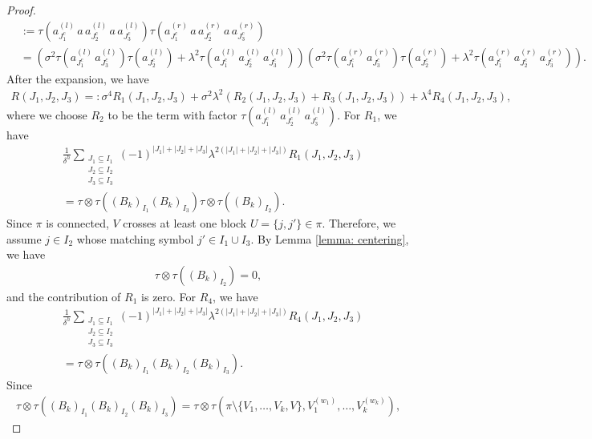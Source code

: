 \documentclass[10pt,a4paper]{amsart}
\begin{document}
\begin{proof}
\begin{align*}
        &:=\tau\left(a_{J_1^c}^{(l)}\, a \, a_{J_2^c}^{(l)}\, a \, a_{J_3^c}^{(l)}\right)\tau\left(a_{J_1^c}^{(r)}\, a \, a_{J_2^c}^{(r)}\, a\, a_{J_3^c}^{(r)}\right)\\
        &=\left(\sigma^2\tau(a_{J_1^c}^{(l)}\, a_{J_3^c}^{(l)})\tau(a_{J_2^c}^{(l)})+\lambda^2\tau(a_{J_1^c}^{(l)}\, a_{J_2^c}^{(l)}\, a_{J_3^c}^{(l)})\right)
        \left(\sigma^2\tau(a_{J_1^c}^{(r)}\, a_{J_3^c}^{(r)})\tau(a_{J_2^c}^{(r)})+\lambda^2\tau(a_{J_1^c}^{(r)}\, a_{J_2^c}^{(r)}\, a_{J_3^c}^{(r)})\right).
    \end{align*}
    After the expansion, we have
    \begin{align*}
        R(J_1,J_2,J_3)=:\sigma^4R_1(J_1,J_2,J_3)+\sigma^2\lambda^2 \left(R_2(J_1,J_2,J_3)+R_3(J_1,J_2,J_3)\right)+\lambda^4R_4(J_1,J_2,J_3),
    \end{align*}
    where we choose $R_2$ to be the term with factor $\tau(a_{J_1^c}^{(l)}\, a_{J_2^c}^{(l)}\, a_{J_3^c}^{(l)})$. For $R_1$, we have
    \begin{align*}
        &\frac{1}{\delta^h}\sum_{\substack{J_1 \subseteq I_1\\ J_2 \subseteq I_2\\ J_3 \subseteq I_3}}(-1)^{|J_1|+|J_2|+|J_3|}\lambda^{2(|J_1|+|J_2|+|J_3|)}R_1(J_1,J_2,J_3)\\
        &=\tau\otimes \tau \left(\left(B_k\right)_{I_1}\left(B_k\right)_{I_3}\right)\tau\otimes \tau\left(\left(B_k\right)_{I_2}\right).
    \end{align*}
    Since $\pi$ is connected, $V$ crosses at least one block $U=\{j,j'\} \in \pi$. Therefore, we assume $j \in I_2$ whose matching symbol $j' \in I_1\cup I_3$. By Lemma \ref{lemma: centering}, we have
    \begin{align*}
        \tau\otimes \tau\left(\left(B_k\right)_{I_2}\right)=0,
    \end{align*}
    and the contribution of $R_1$ is zero. For $R_4$, we have
    \begin{align*}
        &\frac{1}{\delta^h}\sum_{\substack{J_1 \subseteq I_1\\ J_2 \subseteq I_2\\ J_3 \subseteq I_3}}(-1)^{|J_1|+|J_2|+|J_3|}\lambda^{2(|J_1|+|J_2|+|J_3|)}R_4(J_1,J_2,J_3)\\
        &=\tau\otimes \tau \left(\left(B_k\right)_{I_1}\left(B_k\right)_{I_2}\left(B_k\right)_{I_3}\right).
    \end{align*}
    Since
    \begin{align*}
        \tau\otimes \tau \left(\left(B_k\right)_{I_1}\left(B_k\right)_{I_2}\left(B_k\right)_{I_3}\right)=\tau\otimes\tau\left(\pi\setminus\{V_1,\ldots,V_k,V\},V_1^{(w_1)},\ldots,V_k^{(w_k)}\right),

\end{align*}
\end{proof}
\end{document}
